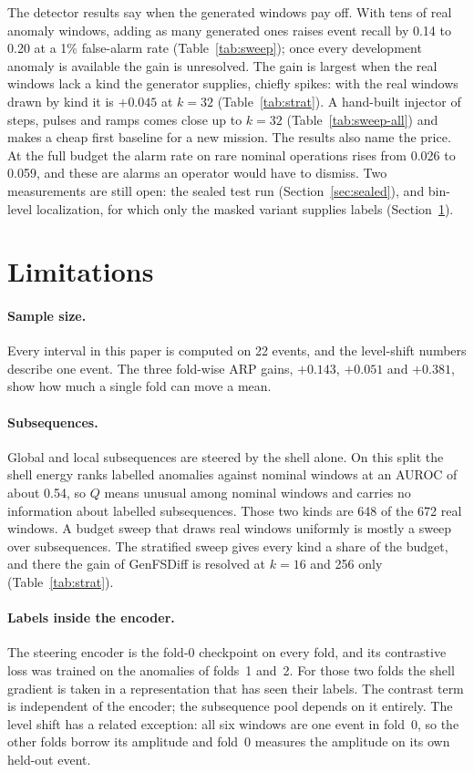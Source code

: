 \documentclass[11pt,a4paper]{article}
\begin{document}
The detector results say when the generated windows pay off. With tens of real
anomaly windows, adding as many generated ones raises event recall by 0.14 to
0.20 at a 1\% false-alarm rate (Table~\ref{tab:sweep}); once every development
anomaly is available the gain is unresolved. The gain is largest when the
real windows lack a kind the generator supplies, chiefly spikes: with the
real windows drawn by kind it is $+0.045$ at $k = 32$ (Table~\ref{tab:strat}).
A hand-built injector of steps, pulses and ramps comes close up to $k = 32$
(Table~\ref{tab:sweep-all}) and makes a cheap first baseline for a new
mission. The results also name the price. At the
full budget the alarm rate on rare nominal operations rises from 0.026 to
0.059, and these are alarms an operator would have to dismiss. Two
measurements are still open: the sealed test run (Section~\ref{sec:sealed}), and bin-level localization,
for which only the masked variant supplies labels (Section~\ref{sec:limits}).

\section{Limitations}
\label{sec:limits}

\paragraph{Sample size.}
Every interval in this paper is computed on 22 events, and the level-shift
numbers describe one event. The three fold-wise ARP gains, $+0.143$, $+0.051$
and $+0.381$, show how much a single fold can move a mean.

\paragraph{Subsequences.}
Global and local subsequences are steered by the shell alone. On this split
the shell energy ranks labelled anomalies against nominal windows at an AUROC
of about 0.54, so $Q$ means unusual among nominal windows and carries no
information about labelled subsequences. Those two kinds are 648 of the 672
real windows. A budget sweep that draws real windows uniformly is mostly a
sweep over subsequences. The stratified sweep gives every kind a share of the
budget, and there the gain of GenFSDiff is resolved at $k = 16$ and 256 only
(Table~\ref{tab:strat}).

\paragraph{Labels inside the encoder.}
The steering encoder is the fold-0 checkpoint on every fold, and its
contrastive loss was trained on the anomalies of folds~1 and~2. For those two
folds the shell gradient is taken in a representation that has seen their
labels. The contrast term is independent of the encoder; the subsequence pool
depends on it entirely. The level shift has a related exception: all six
windows are one event in fold~0, so the other folds borrow its amplitude and
fold~0 measures the amplitude on its own held-out event.
\end{document}
